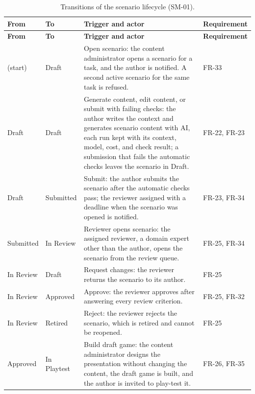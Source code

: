 {\small{}\renewcommand{\arraystretch}{1.1}
\begin{longtable}{|>{\raggedright\arraybackslash}p{}|>{\raggedright\arraybackslash}p{}|>{\raggedright\arraybackslash}p{}|>{\raggedright\arraybackslash}p{}|}
\caption{Transitions of the scenario lifecycle (SM-01).} \\
\hline
\textbf{From} & \textbf{To} & \textbf{Trigger and actor} & \textbf{Requirement} \\ \hline
\endfirsthead
\hline
\textbf{From} & \textbf{To} & \textbf{Trigger and actor} & \textbf{Requirement} \\ \hline
\endhead
(start) & Draft & Open scenario: the content administrator opens a scenario for a task, and the author is notified. A second active scenario for the same task is refused. & FR-33 \\ \hline
Draft & Draft & Generate content, edit content, or submit with failing checks: the author writes the context and generates scenario content with AI, each run kept with its context, model, cost, and check result; a submission that fails the automatic checks leaves the scenario in Draft. & FR-22, FR-23 \\ \hline
Draft & Submitted & Submit: the author submits the scenario after the automatic checks pass; the reviewer assigned with a deadline when the scenario was opened is notified. & FR-23, FR-34 \\ \hline
Submitted & In Review & Reviewer opens scenario: the assigned reviewer, a domain expert other than the author, opens the scenario from the review queue. & FR-25, FR-34 \\ \hline
In Review & Draft & Request changes: the reviewer returns the scenario to its author. & FR-25 \\ \hline
In Review & Approved & Approve: the reviewer approves after answering every review criterion. & FR-25, FR-32 \\ \hline
In Review & Retired & Reject: the reviewer rejects the scenario, which is retired and cannot be reopened. & FR-25 \\ \hline
Approved & In Playtest & Build draft game: the content administrator designs the presentation without changing the content, the draft game is built, and the author is invited to play-test it. & FR-26, FR-35 \\ \hline

\end{longtable}}

